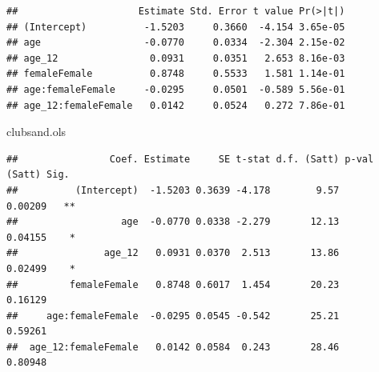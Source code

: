 \documentclass[
]{article}
\newenvironment{Shaded}{\begin{snugshade}}{\end{snugshade}}
\newcommand{\AttributeTok}[1]{\textcolor[rgb]{0.13,0.29,0.53}{#1}}
\newcommand{\CommentTok}[1]{\textcolor[rgb]{0.56,0.35,0.01}{\textit{#1}}}
\newcommand{\FunctionTok}[1]{\textcolor[rgb]{0.13,0.29,0.53}{\textbf{#1}}}
\newcommand{\NormalTok}[1]{#1}
\newcommand{\OtherTok}[1]{\textcolor[rgb]{0.56,0.35,0.01}{#1}}
\newcommand{\SpecialCharTok}[1]{\textcolor[rgb]{0.81,0.36,0.00}{\textbf{#1}}}
\newcommand{\StringTok}[1]{\textcolor[rgb]{0.31,0.60,0.02}{#1}}
\begin{document}
\begin{Shaded}
\end{Shaded}

\begin{verbatim}
##                     Estimate Std. Error t value Pr(>|t|)
## (Intercept)          -1.5203     0.3660  -4.154 3.65e-05
## age                  -0.0770     0.0334  -2.304 2.15e-02
## age_12                0.0931     0.0351   2.653 8.16e-03
## femaleFemale          0.8748     0.5533   1.581 1.14e-01
## age:femaleFemale     -0.0295     0.0501  -0.589 5.56e-01
## age_12:femaleFemale   0.0142     0.0524   0.272 7.86e-01
\end{verbatim}

\begin{Shaded}
\begin{Highlighting}[]
\NormalTok{clubsand.ols}
\end{Highlighting}
\end{Shaded}

\begin{verbatim}
##                Coef. Estimate     SE t-stat d.f. (Satt) p-val (Satt) Sig.
##          (Intercept)  -1.5203 0.3639 -4.178        9.57      0.00209   **
##                  age  -0.0770 0.0338 -2.279       12.13      0.04155    *
##               age_12   0.0931 0.0370  2.513       13.86      0.02499    *
##         femaleFemale   0.8748 0.6017  1.454       20.23      0.16129     
##     age:femaleFemale  -0.0295 0.0545 -0.542       25.21      0.59261     
##  age_12:femaleFemale   0.0142 0.0584  0.243       28.46      0.80948
\end{verbatim}
\end{document}
